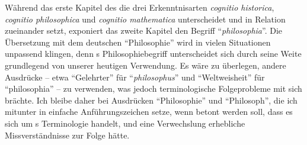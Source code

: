 Während das erste Kapitel des  die drei Erkenntnisarten \emph{cognitio historica}, \emph{cognitio
philosophica} und \emph{cognitio mathematica} unterscheidet und in Relation
zueinander setzt, exponiert das zweite Kapitel den Begriff
\enquote{\emph{philosophia}}. Die Übersetzung mit dem deutschen
\enquote{Philosophie} wird in vielen Situationen unpassend klingen, denn
s
Philosophiebegriff unterscheidet sich durch seine Weite grundlegend von unserer
heutigen Verwendung. Es wäre zu überlegen, andere Ausdrücke -- etwa
\enquote{Gelehrter} für \enquote{\emph{philosophus}} und \enquote{Weltweisheit}
für \enquote{philosophia} -- zu verwenden, was jedoch terminologische
Folgeprobleme mit sich brächte. Ich bleibe daher bei Ausdrücken
\enquote{Philosophie} und \enquote{Philosoph}, die ich mitunter in einfache
Anführungszeichen setze, wenn betont werden soll, dass es sich um s
Terminologie handelt, und eine Verwechslung erhebliche Missverständnisse zur
Folge hätte.


